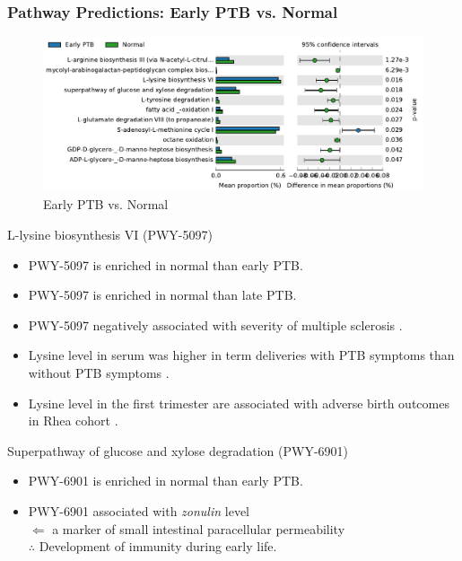 \documentclass{beamer}
\begin{document}
    \begin{frame}[allowframebreaks]
        \frametitle{Pathway Predictions: Early PTB vs. Normal}

        \begin{figure}
            \includegraphics[width=0.9 \linewidth]{figures/PICRUSt2/EF.pdf}
            \caption{Early PTB vs. Normal}
        \end{figure}

        \begin{block}{L-lysine biosynthesis VI (PWY-5097)}
            \begin{itemize}
                \item PWY-5097 is enriched in normal than early PTB.
                \item PWY-5097 is enriched in normal than late PTB.
                \item PWY-5097 negatively associated with severity of multiple sclerosis \cite{PWY-5097-1}.
                \item Lysine level in serum was higher in term deliveries with PTB symptoms than without PTB symptoms \cite{PWY-5097-2}.
                \item Lysine level in the first trimester are associated with adverse birth outcomes in Rhea cohort \cite{PWY-5097-3}.
            \end{itemize}
        \end{block}

        \begin{block}{Superpathway of glucose and xylose degradation (PWY-6901)}
            \begin{itemize}
                \item PWY-6901 is enriched in normal than early PTB.
                \item PWY-6901 associated with \textit{zonulin} level \cite{PWY-6901-1} \\
                    $\Leftarrow$ a marker of small intestinal paracellular permeability \\
                    $\therefore$ Development of immunity during early life.
            \end{itemize}
        \end{block}


\end{frame}
\end{document}
